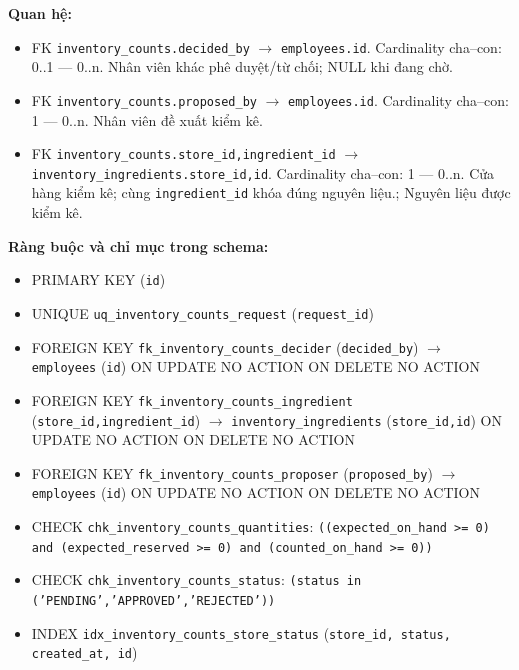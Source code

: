 \textbf{Quan hệ:}

\begin{itemize}

\item FK \texttt{inventory\_counts.decided\_by} $\rightarrow$ \texttt{employees.id}. Cardinality cha--con: 0..1 — 0..n. Nhân viên khác phê duyệt/từ chối; NULL khi đang chờ.

\item FK \texttt{inventory\_counts.proposed\_by} $\rightarrow$ \texttt{employees.id}. Cardinality cha--con: 1 — 0..n. Nhân viên đề xuất kiểm kê.

\item FK \texttt{inventory\_counts.store\_id,ingredient\_id} $\rightarrow$ \texttt{inventory\_ingredients.store\_id,id}. Cardinality cha--con: 1 — 0..n. Cửa hàng kiểm kê; cùng \texttt{ingredient\_id} khóa đúng nguyên liệu.; Nguyên liệu được kiểm kê.

\end{itemize}

\textbf{Ràng buộc và chỉ mục trong schema:}

\begin{itemize}

\item PRIMARY KEY (\texttt{id})

\item UNIQUE \texttt{uq\_inventory\_counts\_request} (\texttt{request\_id})

\item FOREIGN KEY \texttt{fk\_inventory\_counts\_decider} (\texttt{decided\_by}) $\rightarrow$ \texttt{employees} (\texttt{id}) ON UPDATE NO ACTION ON DELETE NO ACTION

\item FOREIGN KEY \texttt{fk\_inventory\_counts\_ingredient} (\texttt{store\_id,ingredient\_id}) $\rightarrow$ \texttt{inventory\_ingredients} (\texttt{store\_id,id}) ON UPDATE NO ACTION ON DELETE NO ACTION

\item FOREIGN KEY \texttt{fk\_inventory\_counts\_proposer} (\texttt{proposed\_by}) $\rightarrow$ \texttt{employees} (\texttt{id}) ON UPDATE NO ACTION ON DELETE NO ACTION

\item CHECK \texttt{chk\_inventory\_counts\_quantities}: \texttt{((expected\_on\_hand >= 0) and (expected\_reserved >= 0) and (counted\_on\_hand >= 0))}

\item CHECK \texttt{chk\_inventory\_counts\_status}: \texttt{(status in ('PENDING','APPROVED','REJECTED'))}

\item INDEX \texttt{idx\_inventory\_counts\_store\_status} (\texttt{store\_id, status, created\_at, id})

\end{itemize}

